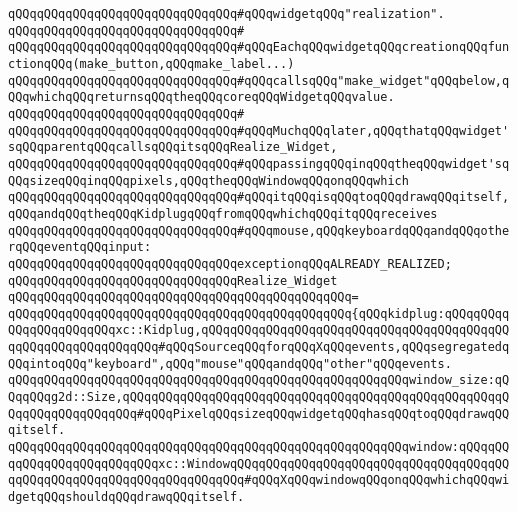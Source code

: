 \verb|qQQqqQQqqQQqqQQqqQQqqQQqqQQqqQQq#qQQqwidgetqQQq"realization".|\newline
\verb|qQQqqQQqqQQqqQQqqQQqqQQqqQQqqQQq#|\newline
\verb|qQQqqQQqqQQqqQQqqQQqqQQqqQQqqQQq#qQQqEachqQQqwidgetqQQqcreationqQQqfunctionqQQq(make_button,qQQqmake_label...)|\newline
\verb|qQQqqQQqqQQqqQQqqQQqqQQqqQQqqQQq#qQQqcallsqQQq"make_widget"qQQqbelow,qQQqwhichqQQqreturnsqQQqtheqQQqcoreqQQqWidgetqQQqvalue.|\newline
\verb|qQQqqQQqqQQqqQQqqQQqqQQqqQQqqQQq#|\newline
\verb|qQQqqQQqqQQqqQQqqQQqqQQqqQQqqQQq#qQQqMuchqQQqlater,qQQqthatqQQqwidget'sqQQqparentqQQqcallsqQQqitsqQQqRealize_Widget,|\newline
\verb|qQQqqQQqqQQqqQQqqQQqqQQqqQQqqQQq#qQQqpassingqQQqinqQQqtheqQQqwidget'sqQQqsizeqQQqinqQQqpixels,qQQqtheqQQqWindowqQQqonqQQqwhich|\newline
\verb|qQQqqQQqqQQqqQQqqQQqqQQqqQQqqQQq#qQQqitqQQqisqQQqtoqQQqdrawqQQqitself,qQQqandqQQqtheqQQqKidplugqQQqfromqQQqwhichqQQqitqQQqreceives|\newline
\verb|qQQqqQQqqQQqqQQqqQQqqQQqqQQqqQQq#qQQqmouse,qQQqkeyboardqQQqandqQQqotherqQQqeventqQQqinput:|\newline
\newline
\verb|qQQqqQQqqQQqqQQqqQQqqQQqqQQqqQQqexceptionqQQqALREADY_REALIZED;|\newline
\newline
\verb|qQQqqQQqqQQqqQQqqQQqqQQqqQQqqQQqRealize_Widget|\newline
\verb|qQQqqQQqqQQqqQQqqQQqqQQqqQQqqQQqqQQqqQQqqQQqqQQq=|\newline
\verb|qQQqqQQqqQQqqQQqqQQqqQQqqQQqqQQqqQQqqQQqqQQqqQQq{qQQqkidplug:qQQqqQQqqQQqqQQqqQQqqQQqxc::Kidplug,qQQqqQQqqQQqqQQqqQQqqQQqqQQqqQQqqQQqqQQqqQQqqQQqqQQqqQQqqQQqqQQq#qQQqSourceqQQqforqQQqXqQQqevents,qQQqsegregatedqQQqintoqQQq"keyboard",qQQq"mouse"qQQqandqQQq"other"qQQqevents.|\newline
\verb|qQQqqQQqqQQqqQQqqQQqqQQqqQQqqQQqqQQqqQQqqQQqqQQqqQQqqQQqwindow_size:qQQqqQQqg2d::Size,qQQqqQQqqQQqqQQqqQQqqQQqqQQqqQQqqQQqqQQqqQQqqQQqqQQqqQQqqQQqqQQqqQQqqQQq#qQQqPixelqQQqsizeqQQqwidgetqQQqhasqQQqtoqQQqdrawqQQqitself.|\newline
\verb|qQQqqQQqqQQqqQQqqQQqqQQqqQQqqQQqqQQqqQQqqQQqqQQqqQQqqQQqwindow:qQQqqQQqqQQqqQQqqQQqqQQqqQQqxc::WindowqQQqqQQqqQQqqQQqqQQqqQQqqQQqqQQqqQQqqQQqqQQqqQQqqQQqqQQqqQQqqQQqqQQqqQQq#qQQqXqQQqwindowqQQqonqQQqwhichqQQqwidgetqQQqshouldqQQqdrawqQQqitself.|\newline
